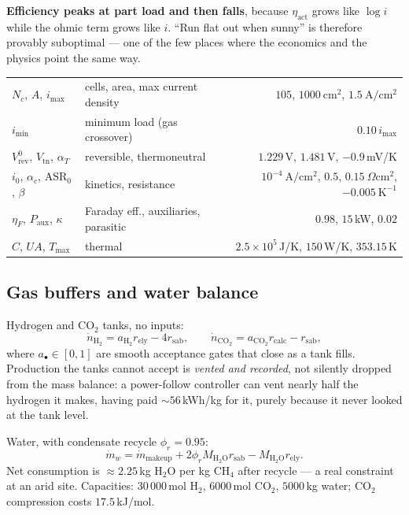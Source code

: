 \documentclass[11pt,a4paper]{article}
\begin{document}
\textbf{Efficiency peaks at part load and then falls}, because $\eta_{\text{act}}$
grows like $\log i$ while the ohmic term grows like $i$. ``Run flat out when
sunny'' is therefore provably suboptimal --- one of the few places where the
economics and the physics point the same way.

\begin{center}\small
\begin{tabular}{llr}
\toprule
$N_c$, $A$, $i_{\max}$ & cells, area, max current density & $105$, $1000\ \mathrm{cm^2}$, $1.5\ \mathrm{A/cm^2}$\\
$i_{\min}$ & minimum load (gas crossover) & $0.10\,i_{\max}$\\
$V_{\text{rev}}^0$, $V_{\text{tn}}$, $\alpha_T$ & reversible, thermoneutral & $1.229$\,V, $1.481$\,V, $-0.9$\,mV/K\\
$i_0$, $\alpha_c$, $\mathrm{ASR}_0$, $\beta$ & kinetics, resistance & $10^{-4}\ \mathrm{A/cm^2}$, $0.5$, $0.15\ \Omega\mathrm{cm^2}$, $-0.005\ \mathrm{K^{-1}}$\\
$\eta_F$, $P_{\text{aux}}$, $\kappa$ & Faraday eff., auxiliaries, parasitic & $0.98$, $15$\,kW, $0.02$\\
$C$, $UA$, $T_{\max}$ & thermal & $2.5\times10^5$\,J/K, $150$\,W/K, $353.15$\,K\\
\bottomrule
\end{tabular}
\end{center}

\subsection{Gas buffers and water balance}

Hydrogen and CO$_2$ tanks, no inputs:
\begin{equation}
\dot n_{\mathrm{H_2}} = a_{\mathrm{H_2}} r_{\text{ely}} - 4 r_{\text{sab}},
\qquad
\dot n_{\mathrm{CO_2}} = a_{\mathrm{CO_2}} r_{\text{calc}} - r_{\text{sab}},
\end{equation}
where $a_\bullet\in[0,1]$ are smooth acceptance gates that close as a tank fills.
Production the tanks cannot accept is \emph{vented and recorded}, not silently
dropped from the mass balance: a power-follow controller can vent nearly half the
hydrogen it makes, having paid ${\sim}56$\,kWh/kg for it, purely because it never
looked at the tank level.

Water, with condensate recycle $\phi_r = 0.95$:
\begin{equation}
\dot m_{w} = \dot m_{\text{makeup}} + 2\phi_r M_{\mathrm{H_2O}} r_{\text{sab}} - M_{\mathrm{H_2O}} r_{\text{ely}} .
\end{equation}
Net consumption is ${\approx}2.25$\,kg H$_2$O per kg CH$_4$ after recycle --- a
real constraint at an arid site. Capacities: $30\,000$\,mol H$_2$,
$6000$\,mol CO$_2$, $5000$\,kg water; CO$_2$ compression costs $17.5$\,kJ/mol.
\end{document}

